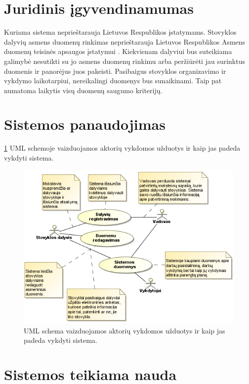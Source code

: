 \section{Juridinis įgyvendinamumas}

Kuriama sistema neprieštarauja Lietuvos Respublikos įstatymams. Stovyklos 
dalyvių asmens duomenų rinkimas neprieštarauja Lietuvos Respublikos 
Asmens duomenų teisinės apsaugos įstatymui \cite{istat_duom_apsaug}.
Kiekvienam dalyviui bus 
suteikiama galimybė nesutikti su jo asmens duomenų rinkimu arba 
peržiūrėti jau surinktus duomenis ir panorėjus juos pakeisti. 
Pasibaigus stovyklos organizavimo ir vykdymo laikotarpiui, nereikalingi 
duomenys bus sunaikinami. Taip pat numatoma laikytis visų duomenų saugumo 
kriterijų.

\section{Sistemos panaudojimas}

\ref{fig:uml_tasks} UML schemoje vaizduojamos aktorių vykdomos užduotys ir 
kaip jas padeda vykdyti sistema.

\begin{figure}[h!]
  \begin{center}
    \includegraphics[scale=0.8]{images/sistemos_panaudojimas.png}
  \end{center}
  \caption{UML schema vaizduojamos aktorių vykdomos užduotys ir kaip jas
    padeda vykdyti sistema.}
  \label{fig:uml_tasks}
\end{figure}

\section{Sistemos teikiama nauda}

